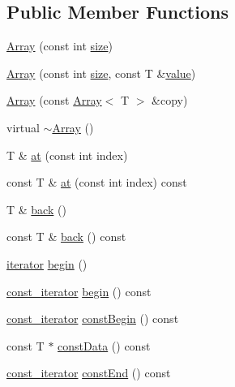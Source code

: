 \subsection*{Public Member Functions}
\begin{DoxyCompactItemize}
\item 
\hyperlink{classprism_1_1_array_aab128f1ed5a4547a04812b921dc75897}{Array} (const int \hyperlink{classprism_1_1_array_a83c88f0f351ac35798f40ed4e922e187}{size})
\item 
\hyperlink{classprism_1_1_array_ac696e19a99b7a601f013352617689098}{Array} (const int \hyperlink{classprism_1_1_array_a83c88f0f351ac35798f40ed4e922e187}{size}, const T \&\hyperlink{classprism_1_1_array_a2c5690996975510eed7112066b936d8f}{value})
\item 
\hyperlink{classprism_1_1_array_a15f0a0b32b4d95975fd15f0c1321d144}{Array} (const \hyperlink{classprism_1_1_array}{Array}$<$ T $>$ \&copy)
\item 
virtual \hyperlink{classprism_1_1_array_ad8787402f15054e257a7b407f07f469e}{$\sim$\+Array} ()
\item 
T \& \hyperlink{classprism_1_1_array_a669341733bb97105adcedc9a9e159dcd}{at} (const int index)
\item 
const T \& \hyperlink{classprism_1_1_array_ae88b7be661d69a754c1a9a49adb7e9b7}{at} (const int index) const 
\item 
T \& \hyperlink{classprism_1_1_array_a23345041d2c537ad6cffc7e2a3afcfe4}{back} ()
\item 
const T \& \hyperlink{classprism_1_1_array_a4efee82c9091e2656d65ea5a9a2c2fd8}{back} () const 
\item 
\hyperlink{classprism_1_1_array_a6814c2af67e8b3fc48b02319f5e63d50}{iterator} \hyperlink{classprism_1_1_array_a2458620d3d5270c7ce2cb6413b65e731}{begin} ()
\item 
\hyperlink{classprism_1_1_array_ab78c83a88959a72d59e5f930540be94a}{const\+\_\+iterator} \hyperlink{classprism_1_1_array_a37f88fd8b0776145a47e7d14b7681d28}{begin} () const 
\item 
\hyperlink{classprism_1_1_array_ab78c83a88959a72d59e5f930540be94a}{const\+\_\+iterator} \hyperlink{classprism_1_1_array_a08b8bf28cf5ee167e240792923c90415}{const\+Begin} () const 
\item 
const T $\ast$ \hyperlink{classprism_1_1_array_af6e860868e38d2779f0839e1815ea0bd}{const\+Data} () const 
\item 
\hyperlink{classprism_1_1_array_ab78c83a88959a72d59e5f930540be94a}{const\+\_\+iterator} \hyperlink{classprism_1_1_array_a275ef3df386f5f8c3c785a0eba0f15a0}{const\+End} () const 

\end{DoxyCompactItemize}
